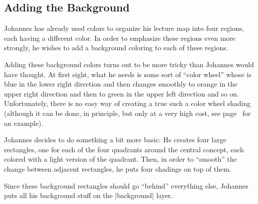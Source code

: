 \subsection{Adding the Background}

Johannes has already used colors to organize his lecture map into four
regions, each having a different color. In order to emphasize these
regions even more strongly, he wishes to add a background coloring to
each of these regions.

Adding these background colors turns out to be more tricky than
Johannes would have thought. At first sight, what he needs is some
sort of ``color wheel'' whose is blue in the lower right direction and
then changes smoothly to orange in the upper right direction and then
to green in the upper left direction and so on. Unfortunately, there
is no easy way of creating a true such a color wheel shading (although
it can be done, in principle, but only at a very high cost, see
page~\pageref{shading-color-wheel} for an example).

Johannes decides to do something a bit more basic: He creates four
large rectangles, one for each of the four quadrants around the
central concept, each colored with a light version of the
quadrant. Then, in order to ``smooth'' the change between adjacent
rectangles, he puts four shadings on top of them.

Since these background rectangles should go ``behind'' everything
else, Johannes puts all his background stuff on the |background|
layer.

